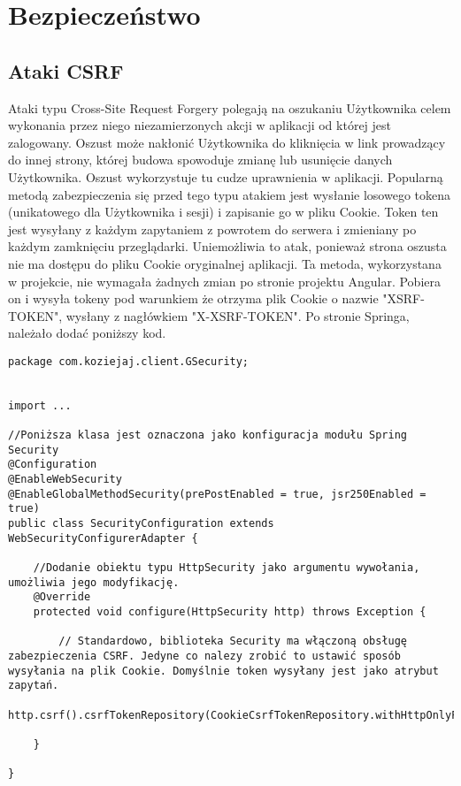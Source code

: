 \documentclass[a4paper,12pt,twoside,openany]{report}
\begin{document}
\chapter{Bezpieczeństwo}
\label{Safety}
\section{Ataki CSRF}
Ataki typu Cross-Site Request Forgery \cite{Owasp} polegają na oszukaniu Użytkownika celem wykonania przez niego niezamierzonych akcji w aplikacji od której jest zalogowany. Oszust może nakłonić Użytkownika do kliknięcia w link prowadzący do innej strony, której budowa spowoduje zmianę lub usunięcie  danych Użytkownika. Oszust wykorzystuje tu cudze uprawnienia w aplikacji. Popularną metodą zabezpieczenia się przed tego typu atakiem jest wysłanie losowego tokena (unikatowego dla Użytkownika i sesji) i zapisanie go w pliku Cookie. Token ten jest wysyłany z każdym zapytaniem z powrotem do serwera i zmieniany po każdym zamknięciu przeglądarki. Uniemożliwia to atak, ponieważ strona oszusta nie ma dostępu do pliku Cookie oryginalnej aplikacji. Ta metoda, wykorzystana w projekcie, nie wymagała żadnych zmian po stronie projektu Angular. Pobiera on i wysyła tokeny pod warunkiem że otrzyma plik Cookie o nazwie "XSRF-TOKEN", wysłany z nagłówkiem "X-XSRF-TOKEN". Po stronie Springa, należało dodać poniższy kod.
\begin{lstlisting}
package com.koziejaj.client.GSecurity;


import ...

//Poniższa klasa jest oznaczona jako konfiguracja modułu Spring Security
@Configuration
@EnableWebSecurity
@EnableGlobalMethodSecurity(prePostEnabled = true, jsr250Enabled = true)
public class SecurityConfiguration extends WebSecurityConfigurerAdapter {

	//Dodanie obiektu typu HttpSecurity jako argumentu wywołania, umożliwia jego modyfikację.
    @Override
    protected void configure(HttpSecurity http) throws Exception {
    
		// Standardowo, biblioteka Security ma włączoną obsługę zabezpieczenia CSRF. Jedyne co nalezy zrobić to ustawić sposób wysyłania na plik Cookie. Domyślnie token wysyłany jest jako atrybut zapytań.
        http.csrf().csrfTokenRepository(CookieCsrfTokenRepository.withHttpOnlyFalse());

    }

}
\end{lstlisting}
\end{document}
